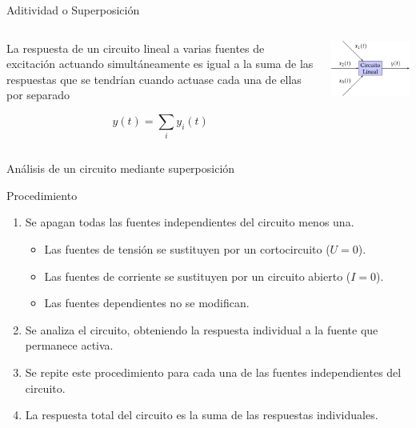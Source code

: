 \documentclass[aspectratio=169, usenames,svgnames,dvipsnames]{beamer}
\begin{document}
\begin{frame}[label={sec:orgbdbbc42}]{Aditividad o Superposición}
\begin{columns}
\begin{column}{0.5\columnwidth}
La respuesta de un \alert{circuito lineal} a varias fuentes de excitación actuando simultáneamente es igual a la suma de las respuestas que se tendrían cuando actuase cada una de ellas por separado

\[
y(t) = \sum_i y_i(t)
\]
\end{column}

\begin{column}{0.5\columnwidth}
\begin{center}
\includegraphics[width=.9\linewidth]{../figs/superposicion.pdf}
\end{center}
\end{column}
\end{columns}
\end{frame}

\begin{frame}[label={sec:org1a78228}]{Análisis de un circuito mediante superposición}
\begin{block}{Procedimiento}
\begin{enumerate}
\item Se apagan todas las fuentes \alert{independientes} del circuito menos una.
\begin{itemize}
\item Las fuentes de tensión se sustituyen por un cortocircuito (\(U = 0\)).
\item Las fuentes de corriente se sustituyen por un circuito abierto (\(I = 0\)).
\item Las fuentes \alert{dependientes} \alert{no} se modifican.
\end{itemize}
\item Se analiza el circuito, obteniendo la respuesta individual a la fuente que permanece activa.
\item Se repite este procedimiento para cada una de las fuentes \alert{independientes} del circuito.
\item La respuesta total del circuito es la suma de las respuestas individuales.
\end{enumerate}
\end{block}
\end{frame}
\end{document}
